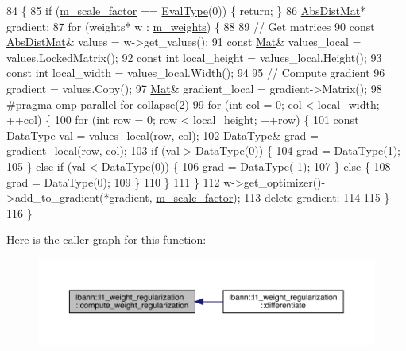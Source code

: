 \begin{DoxyCode}
84                                                              \{
85   \textcolor{keywordflow}{if} (\hyperlink{classlbann_1_1objective__function__term_a59a544b8ff0455ed5091de3bf0d81c3c}{m\_scale\_factor} == \hyperlink{base_8hpp_a3266f5ac18504bbadea983c109566867}{EvalType}(0)) \{ \textcolor{keywordflow}{return}; \}
86   \hyperlink{base_8hpp_a9a697a504ae84010e7439ffec862b470}{AbsDistMat}* gradient;
87   \textcolor{keywordflow}{for} (weights* w : \hyperlink{classlbann_1_1objective__function__term_a1d601c29153ae9cb54c585887608f2bf}{m\_weights}) \{
88 
89     \textcolor{comment}{// Get matrices}
90     \textcolor{keyword}{const} \hyperlink{base_8hpp_a9a697a504ae84010e7439ffec862b470}{AbsDistMat}& values = w->get\_values();
91     \textcolor{keyword}{const} \hyperlink{base_8hpp_a68f11fdc31b62516cb310831bbe54d73}{Mat}& values\_local = values.LockedMatrix();
92     \textcolor{keyword}{const} \textcolor{keywordtype}{int} local\_height = values\_local.Height();
93     \textcolor{keyword}{const} \textcolor{keywordtype}{int} local\_width = values\_local.Width();
94 
95     \textcolor{comment}{// Compute gradient}
96     gradient = values.Copy();
97     \hyperlink{base_8hpp_a68f11fdc31b62516cb310831bbe54d73}{Mat}& gradient\_local = gradient->Matrix();
98 \textcolor{preprocessor}{    #pragma omp parallel for collapse(2)}
99     \textcolor{keywordflow}{for} (\textcolor{keywordtype}{int} col = 0; col < local\_width; ++col) \{
100       \textcolor{keywordflow}{for} (\textcolor{keywordtype}{int} row = 0; row < local\_height; ++row) \{
101         \textcolor{keyword}{const} DataType val = values\_local(row, col);
102         DataType& grad = gradient\_local(row, col);
103         \textcolor{keywordflow}{if} (val > DataType(0)) \{
104           grad = DataType(1);
105         \} \textcolor{keywordflow}{else} \textcolor{keywordflow}{if} (val < DataType(0)) \{
106           grad = DataType(-1);
107         \} \textcolor{keywordflow}{else} \{
108           grad = DataType(0);
109         \}
110       \}
111     \}
112     w->get\_optimizer()->add\_to\_gradient(*gradient, \hyperlink{classlbann_1_1objective__function__term_a59a544b8ff0455ed5091de3bf0d81c3c}{m\_scale\_factor});
113     \textcolor{keyword}{delete} gradient;
114 
115   \}
116 \}
\end{DoxyCode}
Here is the caller graph for this function\+:\nopagebreak
\begin{figure}[H]
\begin{center}
\leavevmode
\includegraphics[width=350pt]{classlbann_1_1l1__weight__regularization_a9f2c29799fc60449f65bc1127b7514fb_icgraph}
\end{center}
\end{figure}
